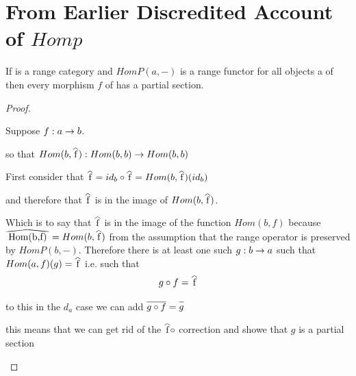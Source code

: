 \documentclass[10pt,a4paper]{article}
\theoremstyle{remark}
\begin{document}
\section{From Earlier Discredited Account of $Homp$}
\begin{lemma}
If \catcw is a range category and $HomP(a,-)$ is a range functor for all objects a of \catcw
then every morphism $f$ of \catcw has a partial section. 
\end{lemma}
\begin{proof} 
\begin{newtt}
Suppose $f:a \rightarrow b$. 

so that $Hom(b,\rng{f}):Hom(b,b) \morph Hom(b,b)$ 
\end{newtt}

First consider that $\rng{f}=id_b \circ \rng{f}=Hom(b,\rng{f})(id_b)$

and therefore that $\rng{f}$ is in the image of $Hom(b,\rng{f})$.

Which is to say that $\rng{f}$  is in the image of the function
$Hom(b,f)$ because $\reallywidehat{Hom(b,f)} = Hom(b,\rng{f})$ from the assumption that the range operator is preserved by $HomP(b,-)$. 
Therefore there is
at least one such $g: b \rightarrow a$ such that $Hom(a,f)(g) = \rng{f}$ i.e. such
that
\begin{equation}
\label{gCondition}
g \circ f = \rng{f}
\end{equation}

\begin{newtt}
to this in the $d_a$ case we can add $\rst{g \circ f} = \rst{g}$

this means that we can get rid of the $\rng{f} \circ$ correction and showe that $g$ is a partial section
\end{newtt}


\end{proof}
\end{document}
